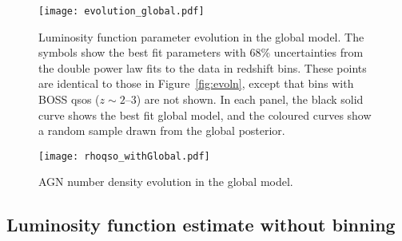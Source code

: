 \documentclass[a4paper,fleqn,usenatbib]{mnras}
\begin{document}
\begin{figure*}
  \begin{center}
    \texttt{[image: evolution\_global.pdf]}
  \end{center}
  \caption{Luminosity function parameter evolution in the global
    model.  The symbols show the best fit parameters with 68\%
    uncertainties from the double power law fits to the data in
    redshift bins.  These points are identical to those in
    Figure~\ref{fig:evoln}, except that bins with BOSS qsos ($z\sim
    2$--$3$) are not shown.  In each panel, the black solid curve
    shows the best fit global model, and the coloured curves show a
    random sample drawn from the global posterior.}
  \label{fig:evoln_global}
\end{figure*}

\begin{figure}
  \begin{center}
    \texttt{[image: rhoqso\_withGlobal.pdf]}
  \end{center}
  \caption{AGN number density evolution in the global model.}
  \label{fig:rhoqso}
\end{figure}

\subsection{Luminosity function estimate without binning}
\end{document}
